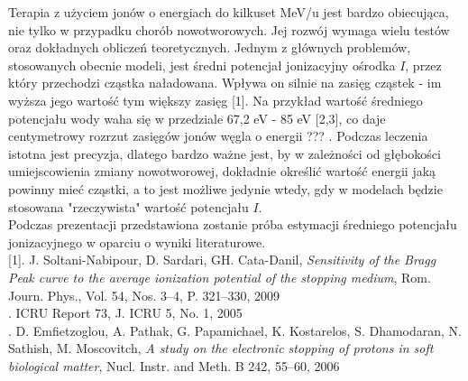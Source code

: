 Terapia z użyciem jonów o energiach do kilkuset MeV/u jest bardzo obiecująca, nie tylko w przypadku chorób nowotworowych.  Jej rozwój wymaga wielu testów oraz dokładnych obliczeń teoretycznych. Jednym z głównych problemów, stosowanych obecnie modeli,  jest średni potencjał jonizacyjny ośrodka $I$, przez który przechodzi cząstka naładowana. Wpływa on silnie na zasięg cząstek - im wyższa jego wartość tym większy zasięg [1]. Na przykład wartość średniego potencjału wody waha się w przedziale 67,2 eV - 85 eV [2,3], co daje centymetrowy rozrzut zasięgów jonów węgla o energii ??? . Podczas leczenia istotna jest precyzja, dlatego bardzo ważne jest, by w zależności od głębokości umiejscowienia zmiany nowotworowej, dokładnie określić wartość energii jaką powinny mieć cząstki, a to jest możliwe jedynie wtedy, gdy w modelach będzie stosowana "rzeczywista" wartość potencjału $I$.\\
Podczas prezentacji przedstawiona zostanie próba estymacji średniego potencjału jonizacyjnego w oparciu o  wyniki literaturowe.\\


[1]. J. Soltani-Nabipour, D. Sardari, GH. Cata-Danil,\textit{ Sensitivity of the Bragg Peak curve to the average ionization potential of the stopping medium}, Rom. Journ. Phys., Vol. 54, Nos. 3–4, P. 321–330, 2009\\
[2]. ICRU Report 73, J. ICRU 5, No. 1, 2005\\
[3]. D. Emfietzoglou, A. Pathak, G. Papamichael, K. Kostarelos, S. Dhamodaran, N. Sathish,
M. Moscovitch, \textit{A study on the electronic stopping of protons in soft biological matter}, Nucl. Instr. and Meth. B 242, 55–60, 2006

